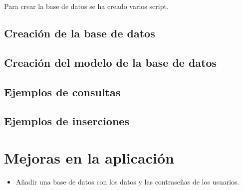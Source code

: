 \documentclass[a4paper]{article}
\begin{document}
	Para crear la base de datos se ha creado varios script.
	\subsection{Creación de la base de datos}
	
	\subsection{Creación del modelo de la base de datos}
	
	
	\subsection{Ejemplos de consultas}
	
	
	\subsection{Ejemplos de inserciones}
	
% 	
	
	\section{Mejoras en la aplicación}\label{mejoras}
	
	\begin{itemize}
		\item Añadir una base de datos con los datos y las contraseñas de los usuarios.
	\end{itemize}
	
\end{document}
